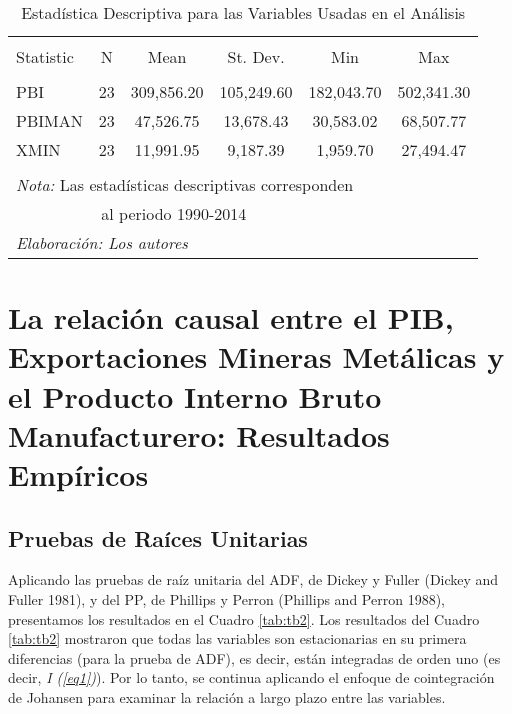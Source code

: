 \documentclass[11pt,]{article}
\begin{document}
\begin{table}[!htbp] \centering 
  \caption{Estadística Descriptiva para las Variables Usadas en el Análisis} 
  \label{tab:descript} 
\small 
\begin{tabular}{@{\extracolsep{5pt}}lccccc} 
\\[-1.8ex]\hline \\[-1.8ex] 
Statistic & \multicolumn{1}{c}{N} & \multicolumn{1}{c}{Mean} & \multicolumn{1}{c}{St. Dev.} & \multicolumn{1}{c}{Min} & \multicolumn{1}{c}{Max} \\ 
\hline 
\hline \\[-1.8ex] 
PBI & 23 & 309,856.20 & 105,249.60 & 182,043.70 & 502,341.30 \\ 
PBIMAN & 23 & 47,526.75 & 13,678.43 & 30,583.02 & 68,507.77 \\ 
XMIN & 23 & 11,991.95 & 9,187.39 & 1,959.70 & 27,494.47 \\ 
\hline 
\hline \\[-1.8ex] 
\multicolumn{6}{l}{\footnotesize{\textit{Nota:} Las estadísticas descriptivas corresponden}} \\ 
\multicolumn{6}{l}{\footnotesize{~~~~~~~~~~ al periodo 1990-2014}} \\ 
\multicolumn{6}{l}{\footnotesize{\textit{Elaboración: Los autores}}} \\ 
\end{tabular} 
\end{table}

\hypertarget{la-relacion-causal-entre-el-pib-exportaciones-mineras-metalicas-y-el-producto-interno-bruto-manufacturero-resultados-empiricos}{%
\section{La relación causal entre el PIB, Exportaciones Mineras
Metálicas y el Producto Interno Bruto Manufacturero: Resultados
Empíricos}\label{la-relacion-causal-entre-el-pib-exportaciones-mineras-metalicas-y-el-producto-interno-bruto-manufacturero-resultados-empiricos}}

\hypertarget{pruebas-de-raices-unitarias}{%
\subsection{Pruebas de Raíces
Unitarias}\label{pruebas-de-raices-unitarias}}

Aplicando las pruebas de raíz unitaria del ADF, de Dickey y Fuller
(Dickey and Fuller 1981), y del PP, de Phillips y Perron (Phillips and
Perron 1988), presentamos los resultados en el Cuadro \ref{tab:tb2}. Los
resultados del Cuadro \ref{tab:tb2} mostraron que todas las variables
son estacionarias en su primera diferencias (para la prueba de ADF), es
decir, están integradas de orden uno (es decir, \emph{I (\ref{eq1})}).
Por lo tanto, se continua aplicando el enfoque de cointegración de
Johansen para examinar la relación a largo plazo entre las variables.
\end{document}
